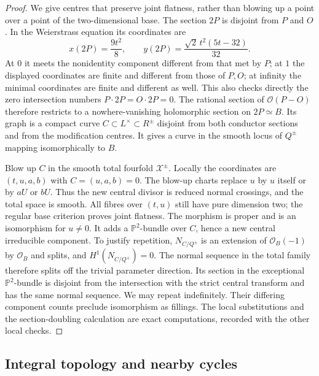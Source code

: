\begin{proof}
We give centres that preserve joint flatness, rather than
blowing up a point over a point of the two-dimensional base.
The section $2P$ is disjoint from $P$ and $O$. In the
Weierstrass equation its coordinates are
\[
 x(2P)=\frac{9t^2}{8},\qquad
 y(2P)=\frac{\sqrt2\,t^2(5t-32)}{32}.
\]
At $0$ it meets the nonidentity component different from
that met by $P$; at $1$ the displayed coordinates are finite
and different from those of $P,O$; at infinity the minimal
coordinates are finite and different as well. This also
checks directly the zero intersection numbers
$P\cdot2P=O\cdot2P=0$. The rational section of
$\mathcal O(P-O)$ therefore restricts to a nowhere-vanishing
holomorphic section on $2P\simeq B$. Its graph is a compact
curve $C\subset L^\times\subset R^\pm$ disjoint from both
conductor sections and from the modification centres.
It gives a curve in the smooth locus of $Q^\pm$ mapping
isomorphically to $B$.

Blow up $C$ in the smooth total fourfold $\mathcal X^\pm$.
Locally the coordinates are $(t,u,a,b)$ with
$C=(u,a,b)=0$. The blow-up charts replace $u$ by $u$ itself
or by $aU$ or $bU$. Thus the new central divisor is reduced
normal crossings, and the total space is smooth. All fibres
over $(t,u)$ still have pure dimension two; the regular base
criterion proves joint flatness. The morphism is proper and
is an isomorphism for $u\ne0$. It adds a
$\mathbb P^2$-bundle over $C$, hence a new central irreducible
component. To justify repetition, $N_{C/Q^\pm}$ is an extension
of $\mathcal O_B(-1)$ by $\mathcal O_B$ and splits, and
$H^1(N_{C/Q^\pm})=0$. The normal sequence in the total family
therefore splits off the trivial parameter direction. Its
section in the exceptional $\mathbb P^2$-bundle is disjoint
from the intersection with the strict central transform and
has the same normal sequence. We may repeat indefinitely.
Their differing component counts preclude
isomorphism as fillings. The local substitutions and the
section-doubling calculation are exact computations, recorded
with the other local checks.
\end{proof}

\subsection{Integral topology and nearby cycles}\label{push:section:A.4}

